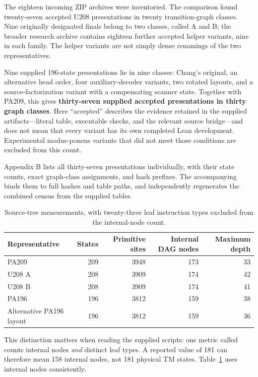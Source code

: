 The eighteen incoming ZIP archives were inventoried. The comparison found twenty-seven accepted U208 presentations in twenty transition-graph classes. Nine originally designated finals belong to two classes, called A and B; the broader research archive contains eighteen further accepted helper variants, nine in each family. The helper variants are not simply dense renamings of the two representatives.

Nine supplied 196-state presentations lie in nine classes: Chang's original, an alternative head order, four auxiliary-decoder variants, two rotated layouts, and a source-factorization variant with a compensating scanner state. Together with PA209, this gives \textbf{thirty-seven supplied accepted presentations in thirty graph classes}. Here ``accepted'' describes the evidence retained in the supplied artifacts---literal table, executable checks, and the relevant source bridge---and does not mean that every variant has its own completed Lean development. Experimental modus-ponens variants that did not meet those conditions are excluded from this count.

Appendix B lists all thirty-seven presentations individually, with their state counts, exact graph-class assignments, and hash prefixes. The accompanying  binds them to full hashes and table paths, and  independently regenerates the combined census from the supplied tables.

\begin{table}[ht]
\centering\small
\begin{tabular}{lrrrr}
\toprule
Representative & States & Primitive sites & Internal DAG nodes & Maximum depth\\
\midrule
PA209 & 209 & 3948 & 173 & 33\\
U208 A & 208 & 3909 & 174 & 42\\
U208 B & 208 & 3909 & 174 & 41\\
PA196 & 196 & 3812 & 159 & 38\\
Alternative PA196 layout & 196 & 3812 & 159 & 36\\
\bottomrule
\end{tabular}
\caption{Source-tree measurements, with twenty-three leaf instruction types excluded from the internal-node count.}\label{tab:source}
\end{table}

This distinction matters when reading the supplied scripts: one metric called  counts internal nodes \emph{and} distinct leaf types. A reported value of 181 can therefore mean 158 internal nodes, not 181 physical TM states. Table~\ref{tab:source} uses internal nodes consistently.

